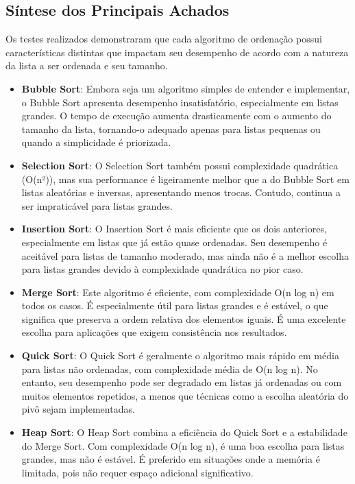 \documentclass[a4paper,12pt]{article}
\begin{document}
\subsection{Síntese dos Principais Achados}

Os testes realizados demonstraram que cada algoritmo de ordenação possui características distintas que impactam seu desempenho de acordo com a natureza da lista a ser ordenada e seu tamanho.

\begin{itemize}
    \item \textbf{Bubble Sort}: Embora seja um algoritmo simples de entender e implementar, o Bubble Sort apresenta desempenho insatisfatório, especialmente em listas grandes. O tempo de execução aumenta drasticamente com o aumento do tamanho da lista, tornando-o adequado apenas para listas pequenas ou quando a simplicidade é priorizada.
    
    \item \textbf{Selection Sort}: O Selection Sort também possui complexidade quadrática (O(n²)), mas sua performance é ligeiramente melhor que a do Bubble Sort em listas aleatórias e inversas, apresentando menos trocas. Contudo, continua a ser impraticável para listas grandes.
    
    \item \textbf{Insertion Sort}: O Insertion Sort é mais eficiente que os dois anteriores, especialmente em listas que já estão quase ordenadas. Seu desempenho é aceitável para listas de tamanho moderado, mas ainda não é a melhor escolha para listas grandes devido à complexidade quadrática no pior caso.
    
    \item \textbf{Merge Sort}: Este algoritmo é eficiente, com complexidade O(n log n) em todos os casos. É especialmente útil para listas grandes e é estável, o que significa que preserva a ordem relativa dos elementos iguais. É uma excelente escolha para aplicações que exigem consistência nos resultados.
    
    \item \textbf{Quick Sort}: O Quick Sort é geralmente o algoritmo mais rápido em média para listas não ordenadas, com complexidade média de O(n log n). No entanto, seu desempenho pode ser degradado em listas já ordenadas ou com muitos elementos repetidos, a menos que técnicas como a escolha aleatória do pivô sejam implementadas.
    
    \item \textbf{Heap Sort}: O Heap Sort combina a eficiência do Quick Sort e a estabilidade do Merge Sort. Com complexidade O(n log n), é uma boa escolha para listas grandes, mas não é estável. É preferido em situações onde a memória é limitada, pois não requer espaço adicional significativo.
\end{itemize}
\end{document}
